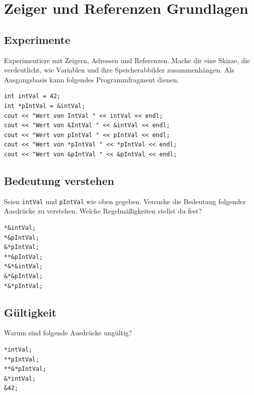

\newcommand{\exday}{2}

\cppSetTitle



\cppSetHeaderAndMakeTitle



\section{Zeiger und Referenzen Grundlagen}

\subsection{Experimente}
Experimentiere mit Zeigern, Adressen und Referenzen.
Mache dir eine Skizze, die verdeutlicht, wie Variablen und ihre Speicherabbilder zusammenhängen.
Als Ausgangsbasis kann folgendes Programmfragment dienen.

\begin{lstlisting}
int intVal = 42;
int *pIntVal = &intVal;
cout << "Wert von IntVal " << intVal << endl;
cout << "Wert von &IntVal " << &intVal << endl;
cout << "Wert von pIntVal " << pIntVal << endl;
cout << "Wert von *pIntVal " << *pIntVal << endl;
cout << "Wert von &pIntVal " << &pIntVal << endl;
\end{lstlisting}

\subsection{Bedeutung verstehen}
Seien \texttt{intVal} und \texttt{pIntVal} wie oben gegeben.
Versuche die Bedeutung folgender Ausdrücke zu verstehen.
Welche Regelmäßigkeiten stellst du fest?

\begin{lstlisting}
*&intVal;
*&pIntVal;
&*pIntVal;
**&pIntVal;
*&*&intVal;
&*&pIntVal;
*&*pIntVal;
\end{lstlisting}



\subsection{Gültigkeit}
Warum sind folgende Ausdrücke ungültig?

\begin{lstlisting}
*intVal;
**pIntVal;
**&*pIntVal;
&*intVal;
&42;
\end{lstlisting}

